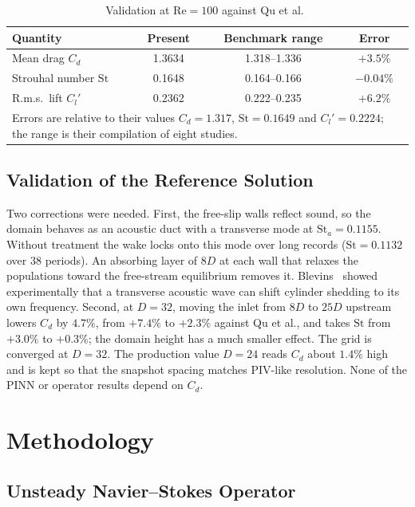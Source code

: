 \documentclass[conference]{IEEEtran}
\newcommand{\Rey}{\mathrm{Re}}
\newcommand{\St}{\mathrm{St}}
\newcommand{\Cd}{C_d}
\begin{document}
\begin{table}[!t]
\centering
\caption{Validation at $\Rey = 100$ against Qu et al.~\cite{qu2013}}
\label{tab:validation}
\begin{tabular}{lccc}
\toprule
Quantity & Present & Benchmark range & Error \\
\midrule
Mean drag $\Cd$       & 1.3634 & 1.318--1.336 & $+3.5\%$ \\
Strouhal number $\St$ & 0.1648 & 0.164--0.166 & $-0.04\%$ \\
R.m.s.\ lift $C_l'$   & 0.2362 & 0.222--0.235 & $+6.2\%$ \\
\bottomrule
\multicolumn{4}{p{0.92\columnwidth}}{\footnotesize Errors are relative to
their values $\Cd = 1.317$, $\St = 0.1649$ and $C_l' = 0.2224$; the range is
their compilation of eight studies.}
\end{tabular}
\end{table}

\subsection{Validation of the Reference Solution}

Two corrections were needed. First, the free-slip walls reflect sound, so the
domain behaves as an acoustic duct with a transverse mode at $\St_a = 0.1155$.
Without treatment the wake locks onto this mode over long records
($\St = 0.1132$ over 38 periods). An absorbing layer of $8D$ at each wall that
relaxes the populations toward the free-stream equilibrium removes it.
Blevins~\cite{blevins1985} showed experimentally that a transverse acoustic
wave can shift cylinder shedding to its own frequency. Second, at $D = 32$,
moving the inlet from $8D$ to $25D$ upstream lowers $\Cd$ by $4.7\%$, from
$+7.4\%$ to $+2.3\%$ against Qu et al., and takes $\St$ from $+3.0\%$ to
$+0.3\%$; the domain height has a much smaller effect. The grid is converged
at $D = 32$. The production value $D = 24$ reads $\Cd$ about $1.4\%$ high and
is kept so that the snapshot spacing matches PIV-like resolution. None of the
PINN or operator results depend on $\Cd$.

\section{Methodology}
\label{sec:method}

\subsection{Unsteady Navier--Stokes Operator}
\end{document}
